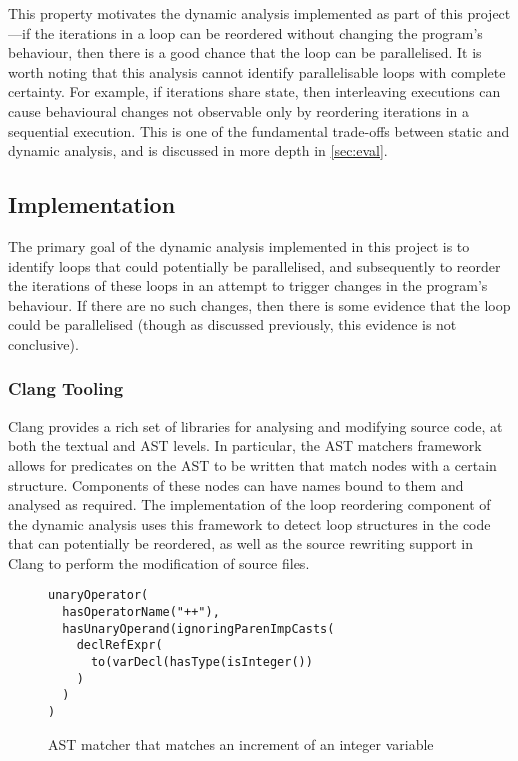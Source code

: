 \documentclass[journal]{IEEEtran}
\begin{document}
This property motivates the dynamic analysis implemented as part of this
project---if the iterations in a loop can be reordered without changing the
program's behaviour, then there is a good chance that the loop can be
parallelised. It is worth noting that this analysis cannot identify
parallelisable loops with complete certainty. For example, if iterations share
state, then interleaving executions can cause behavioural changes not observable
only by reordering iterations in a sequential execution. This is one of the
fundamental trade-offs between static and dynamic analysis, and is discussed in
more depth in \autoref{sec:eval}.

\subsection{Implementation} \label{ssec:impl}

The primary goal of the dynamic analysis implemented in this project is to
identify loops that could potentially be parallelised, and subsequently to
reorder the iterations of these loops in an attempt to trigger changes in the
program's behaviour. If there are no such changes, then there is some evidence
that the loop could be parallelised (though as discussed previously, this
evidence is not conclusive).

\subsubsection{Clang Tooling}

Clang provides a rich set of libraries for analysing and modifying source code,
at both the textual and AST levels. In particular, the AST matchers framework
allows for predicates on the AST to be written that match nodes with a certain
structure. Components of these nodes can have names bound to them and analysed
as required. The implementation of the loop reordering component of the dynamic
analysis uses this framework to detect loop structures in the code that can
potentially be reordered, as well as the source rewriting support in Clang to
perform the modification of source files. 

\begin{figure}[h]
  \centering
  \begin{lstlisting}
unaryOperator(
  hasOperatorName("++"),
  hasUnaryOperand(ignoringParenImpCasts(
    declRefExpr(
      to(varDecl(hasType(isInteger())
    )
  )
)
  \end{lstlisting}
  \caption{AST matcher that matches an increment of an integer variable}
  \label{lst:astm}
\end{figure}
\end{document}
